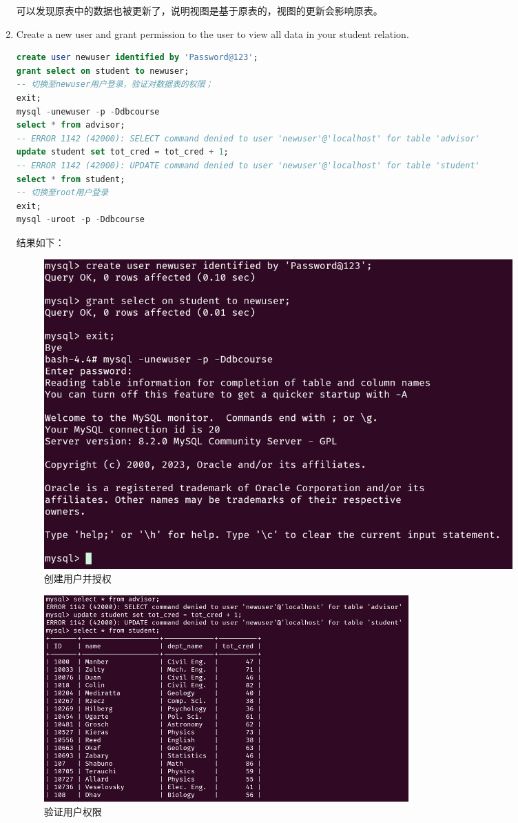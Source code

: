 \documentclass{article}
\begin{document}
\begin{enumerate}
可以发现原表中的数据也被更新了，说明视图是基于原表的，视图的更新会影响原表。

\item Create a new user and grant permission to the user to view all data in your student relation.

\begin{lstlisting}[language=sql]
create user newuser identified by 'Password@123';
grant select on student to newuser;
-- 切换至newuser用户登录，验证对数据表的权限；
exit;
mysql -unewuser -p -Ddbcourse
select * from advisor;
-- ERROR 1142 (42000): SELECT command denied to user 'newuser'@'localhost' for table 'advisor'
update student set tot_cred = tot_cred + 1;
-- ERROR 1142 (42000): UPDATE command denied to user 'newuser'@'localhost' for table 'student'
select * from student;
-- 切换至root用户登录
exit;
mysql -uroot -p -Ddbcourse
\end{lstlisting}

结果如下：

\begin{figure}[H]
\centering
\includegraphics[width=0.9\textwidth]{img/38.png}
\caption{创建用户并授权}
\end{figure}

\begin{figure}[H]
\centering
\includegraphics[width=0.7\textwidth]{img/39.png}
\caption{验证用户权限}
\end{figure}


\end{enumerate}
\end{document}
